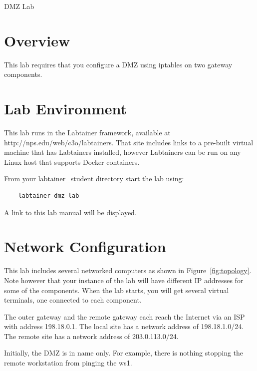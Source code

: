 


\begin{center}
{\LARGE DMZ Lab}
\vspace{0.1in}\\
\end{center}

\copyrightnotice

\section{Overview}
This lab requires that you configure a DMZ using iptables on two gateway components.

\section{Lab Environment}
This lab runs in the Labtainer framework,
available at http://nps.edu/web/c3o/labtainers.
That site includes links to a pre-built virtual machine
that has Labtainers installed, however Labtainers can
be run on any Linux host that supports Docker containers.

From your labtainer_student directory start the lab using:
\begin{verbatim}
    labtainer dmz-lab
\end{verbatim}
\noindent A link to this lab manual will be displayed.  

\section{Network Configuration}
This lab includes several networked computers as shown in Figure~\ref{fig:topology}.
Note however that your instance of the lab will have different IP addresses
for some of the components.
When the lab starts, you will get several virtual terminals, one connected to each
component.

The outer gateway and the remote gateway each reach the Internet via an ISP with 
address 198.18.0.1.  The local site has a network address of 198.18.1.0/24.  The remote
site has a network address of 203.0.113.0/24.

Initially, the DMZ is in name only.  For example, there is nothing stopping the 
remote workstation from pinging the ws1.

